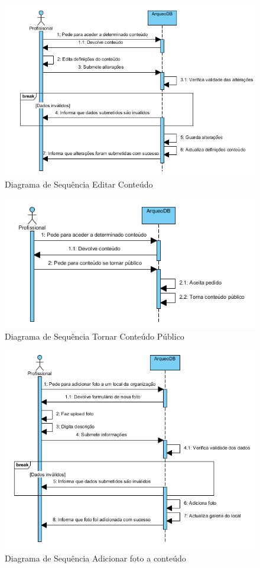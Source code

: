 \documentclass[12pt,a4paper]{article}
\begin{document}
\begin{figure}[h!]
\centering
\includegraphics[scale=0.8]{sequencia/editarconteudo}
\caption{Diagrama de Sequência Editar Conteúdo} 
\end{figure}


 
\begin{figure}[h!]
\centering
\includegraphics[scale=1]{sequencia/tornarpublico}
\caption{Diagrama de Sequência Tornar Conteúdo Público} 
\end{figure}  


\begin{figure}[h!]
\centering
\includegraphics[scale=1]{sequencia/P_adicionarfoto}
\caption{Diagrama de Sequência Adicionar foto a conteúdo} 
\end{figure} 
 
\end{document}
